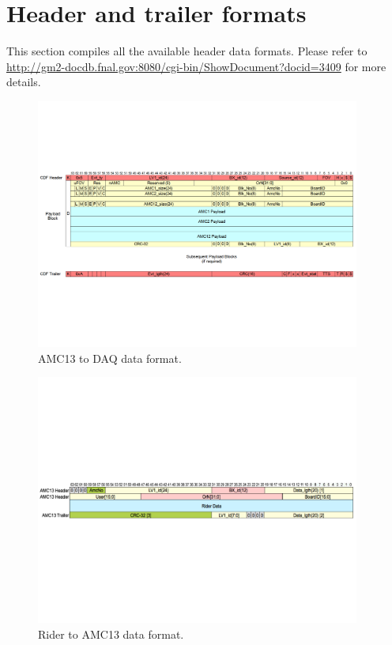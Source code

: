\documentclass[12pt,letterpaper]{article}
\begin{document}
\section{Header and trailer formats}

This section compiles all the available header data formats. Please refer to \url{http://gm2-docdb.fnal.gov:8080/cgi-bin/ShowDocument?docid=3409} for more details.

\begin{figure}[htbp]
\centering
\includegraphics[trim=0cm 6cm 0cm 6cm ,width=0.95\textwidth]{pics/AMC13Header}
\caption{AMC13 to DAQ data format.}
\end{figure}

\begin{figure}[htbp]
\centering
\includegraphics[trim=0cm 9.5cm 0cm 9.5cm ,width=0.95\textwidth]{pics/RiderToAMC13Header}
\caption{Rider to AMC13 data format.}
\end{figure}
\end{document}
